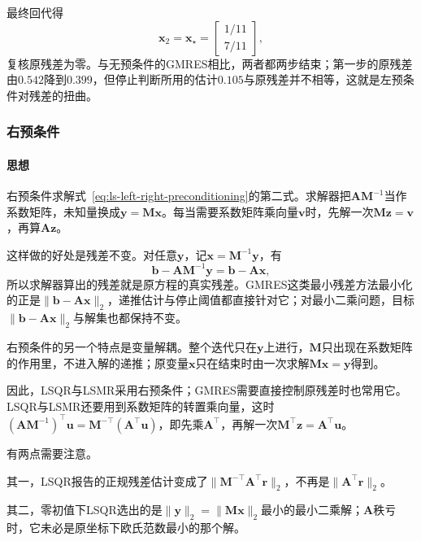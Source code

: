 最终回代得
\[
 \bm x_2=\bm x_\star=\begin{bmatrix}1/11\\7/11\end{bmatrix},
\]
复核原残差为零。与无预条件的GMRES相比，两者都两步结束；第一步的原残差由$0.542$降到$0.399$，但停止判断所用的估计$0.105$与原残差并不相等，这就是左预条件对残差的扭曲。

\subsubsection{右预条件}

\paragraph{思想}
右预条件求解式~\eqref{eq:ls-left-right-preconditioning}的第二式。求解器把$\bm A\bm M^{-1}$当作系数矩阵，未知量换成$\bm y=\bm M\bm x$。每当需要系数矩阵乘向量$\bm v$时，先解一次$\bm M\bm z=\bm v$，再算$\bm A\bm z$。

这样做的好处是残差不变。对任意$\bm y$，记$\bm x=\bm M^{-1}\bm y$，有
\begin{equation}
 \bm b-\bm A\bm M^{-1}\bm y=\bm b-\bm A\bm x ,
 \label{eq:ls-right-preconditioned-residual}
\end{equation}
所以求解器算出的残差就是原方程的真实残差。GMRES这类最小残差方法最小化的正是$\lVert\bm b-\bm A\bm x\rVert_2$，递推估计与停止阈值都直接针对它；对最小二乘问题，目标$\lVert\bm b-\bm A\bm x\rVert_2$与解集也都保持不变。

右预条件的另一个特点是变量解耦。整个迭代只在$\bm y$上进行，$\bm M$只出现在系数矩阵的作用里，不进入解的递推；原变量$\bm x$只在结束时由一次求解$\bm M\bm x=\bm y$得到。

因此，LSQR与LSMR采用右预条件；GMRES需要直接控制原残差时也常用它。LSQR与LSMR还要用到系数矩阵的转置乘向量，这时$(\bm A\bm M^{-1})^\top\bm u=\bm M^{-\top}(\bm A^\top\bm u)$，即先乘$\bm A^\top$，再解一次$\bm M^\top\bm z=\bm A^\top\bm u$。

有两点需要注意。

其一，LSQR报告的正规残差估计变成了$\lVert\bm M^{-\top}\bm A^\top\bm r\rVert_2$，不再是$\lVert\bm A^\top\bm r\rVert_2$。

其二，零初值下LSQR选出的是$\lVert\bm y\rVert_2=\lVert\bm M\bm x\rVert_2$最小的最小二乘解；$\bm A$秩亏时，它未必是原坐标下欧氏范数最小的那个解。

